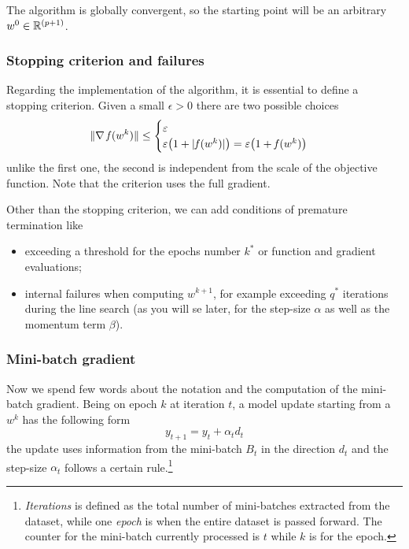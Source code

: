 The algorithm is globally convergent, so the starting point will be an arbitrary $w^0\in\mathbb{R}^{(p+1)}$.

\subsubsection*{Stopping criterion and failures}

Regarding the implementation of the algorithm, it is essential to define a stopping criterion. Given a small $\epsilon>0$ there are two possible choices
\[
\lVert\nabla\operatorname*{\mathit{f}}(w^k)\rVert\leq
\begin{cases}
\varepsilon \\
\varepsilon\bigl(1+\lvert\operatorname*{\mathit{f}}(w^k)\rvert\bigr)=\varepsilon\bigl(1+\operatorname*{\mathit{f}}(w^k)\bigr)
\end{cases}
\]
unlike the first one, the second is independent from the scale of the objective function. Note that the criterion uses the full gradient.

Other than the stopping criterion, we can add conditions of premature termination like
\begin{itemize}
\item exceeding a threshold for the epochs number $k^\ast$ or function and gradient evaluations;
\item internal failures when computing $w^{k+1}$, for example exceeding $q^\ast$ iterations during the line search (as you will se later, for the step-size $\alpha$ as well as the momentum term $\beta$).
\end{itemize}


\subsubsection*{Mini-batch gradient}

Now we spend few words about the notation and the computation of the mini-batch gradient. Being on epoch $k$ at iteration $t$, a model update starting from a $w^k$ has the following form
\begin{equation}\label{eq:sgd-step}
y_{t+1}=y_t+\alpha_td_t
\end{equation}
the update uses information from the mini-batch $B_t$ in the direction $d_t$ and the step-size $\alpha_t$ follows a certain rule.\footnote{\emph{Iterations} is defined as the total number of mini-batches extracted from the dataset, while one \emph{epoch} is when the entire dataset is passed forward. The counter for the mini-batch currently processed is $t$ while $k$ is for the epoch.}

